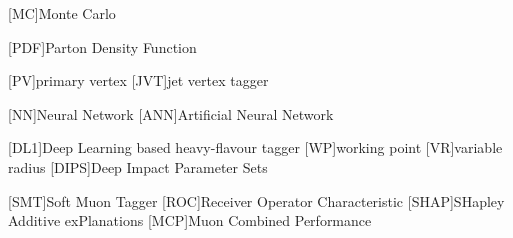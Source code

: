 \begin{acronym}[neos]
    

    [MC]{Monte Carlo}

    [PDF]{Parton Density Function}


    [PV]{primary vertex}
    [JVT]{jet vertex tagger}

    [NN]{Neural Network}
    [ANN]{Artificial Neural Network}
    


    [DL1]{Deep Learning based heavy-flavour tagger}
    [WP]{working point}
    [VR]{variable radius}
    [DIPS]{Deep Impact Parameter Sets}

    [SMT]{Soft Muon Tagger}
    [ROC]{Receiver Operator Characteristic}
    [SHAP]{SHapley Additive exPlanations}
    [MCP]{Muon Combined Performance}


\end{acronym}

